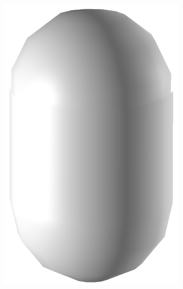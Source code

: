 \begin{figure}
\begin{center}
\begin{subfigure}{0.2\textwidth}
    \includegraphics[width=\linewidth]{assets/images/shapes/bugold/bad_mesh_med}
    \caption{}
    \end{subfigure}
    \begin{subfigure}{0.2\textwidth}

\end{subfigure}
\end{center}
\end{figure}
